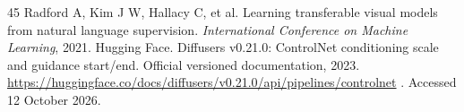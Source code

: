 \documentclass[times,twocolumn,final]{elsarticle}
\providecommand{\DIFadd}[1]{{\protect\color{blue} \sf #1}} %
\providecommand{\DIFdel}[1]{{\protect\color{red} \scriptsize #1}} %
\providecommand{\DIFaddbegin}{} %
\providecommand{\DIFaddend}{} %
\providecommand{\DIFdelbegin}{} %
\providecommand{\DIFdelend}{} %
\begin{document}
\begin{thebibliography}{45}
\DIFdelbegin %
\DIFdel{Radford A, Kim J W, Hallacy C, et al. Learning transferable visual models from natural language supervision. \textit{International Conference on Machine Learning}, 2021.
}\DIFdelend \DIFaddbegin {}
\DIFadd{Hugging Face. Diffusers v0.21.0: ControlNet conditioning scale and guidance start/end. Official versioned documentation, 2023. }\url{https://huggingface.co/docs/diffusers/v0.21.0/api/pipelines/controlnet}\DIFadd{. Accessed 12 October 2026.
}\DIFaddend 

\end{thebibliography}
\DIFaddbegin \endgroup
 \DIFaddend
\end{document}
